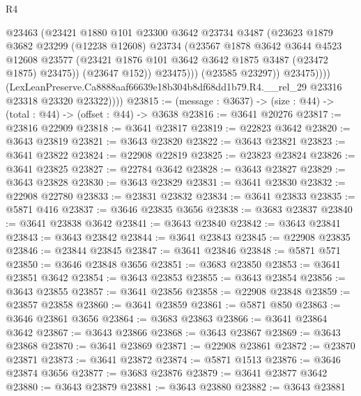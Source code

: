 \begin{lexlean}{R4}
\begin{coremodule}
                        @23463
                        (@23421
                          @1880
                          @101
                          @23300
                          @3642
                          @23734
                          @3487
                          (@23623
                            @1879
                            @3682
                            @23299
                            (@12238 @12608)
                            @23734
                            (@23567
                              @1878
                              @3642
                              @3644
                              @4523
                              @12608
                              @23577
                              (@23421 @1876 @101 @3642 @3642 @1875 @3487 (@23472 @1875) @23475))
                            (@23647 @152))
                          @23475)))
                    (@23585 @23297))
                  @23475))))
          (LexLeanPreserve.Ca8888aaf66639e18b304b8df68dd1b79.R4.__rel_29
            @23316
            @23318
            @23320
            @23322))))
@23815 := (message : @3637) -> (size : @44) -> (total : @44) -> (offset : @44) -> @3638
@23816 := @3641 @20276
@23817 := @23816 @22909
@23818 := @3641 @23817
@23819 := @22823 @3642
@23820 := @3643 @23819
@23821 := @3643 @23820
@23822 := @3643 @23821
@23823 := @3641 @23822
@23824 := @22908 @22819
@23825 := @23823 @23824
@23826 := @3641 @23825
@23827 := @22784 @3642
@23828 := @3643 @23827
@23829 := @3643 @23828
@23830 := @3643 @23829
@23831 := @3641 @23830
@23832 := @22908 @22780
@23833 := @23831 @23832
@23834 := @3641 @23833
@23835 := @5871 @416
@23837 := @3646 @23835 @3656
@23838 := @3683 @23837
@23840 := @3641 @23838 @3642
@23841 := @3643 @23840
@23842 := @3643 @23841
@23843 := @3643 @23842
@23844 := @3641 @23843
@23845 := @22908 @23835
@23846 := @23844 @23845
@23847 := @3641 @23846
@23848 := @5871 @571
@23850 := @3646 @23848 @3656
@23851 := @3683 @23850
@23853 := @3641 @23851 @3642
@23854 := @3643 @23853
@23855 := @3643 @23854
@23856 := @3643 @23855
@23857 := @3641 @23856
@23858 := @22908 @23848
@23859 := @23857 @23858
@23860 := @3641 @23859
@23861 := @5871 @850
@23863 := @3646 @23861 @3656
@23864 := @3683 @23863
@23866 := @3641 @23864 @3642
@23867 := @3643 @23866
@23868 := @3643 @23867
@23869 := @3643 @23868
@23870 := @3641 @23869
@23871 := @22908 @23861
@23872 := @23870 @23871
@23873 := @3641 @23872
@23874 := @5871 @1513
@23876 := @3646 @23874 @3656
@23877 := @3683 @23876
@23879 := @3641 @23877 @3642
@23880 := @3643 @23879
@23881 := @3643 @23880
@23882 := @3643 @23881

\end{coremodule}
\end{lexlean}
